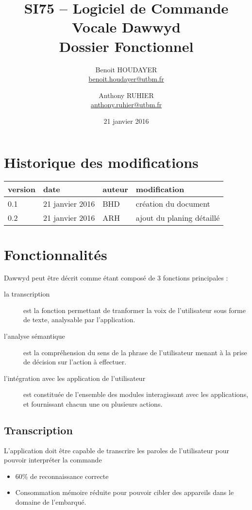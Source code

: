 \documentclass[12pt]{article}
\title{\textbf{SI75 -- Logiciel de Commande Vocale Dawwyd\\[0.5em]Dossier Fonctionnel}}
\author{Benoit HOUDAYER \\ \href{mailto:benoit.houdayer@utbm.fr}{benoit.houdayer@utbm.fr}
\and Anthony RUHIER \\ \href{mailto:anthony.ruhier@utbm.fr}{anthony.ruhier@utbm.fr}}
\date{21 janvier 2016}
\begin{document}
    \maketitle
    \thispagestyle{empty}
    \tableofcontents
    \listoffigures

    \section*{Historique des modifications}

    \begin{table}
    \centering

    \begin{tabular}{|l|l|l|l|}
        \hline
        version & date & auteur & modification \\
        \hline
        0.1 & 21 janvier 2016 & BHD & création du document \\
        0.2 & 21 janvier 2016 & ARH & ajout du planing détaillé \\
        \hline
    \end{tabular}
    \end{table}

    \afterpage{\cfoot{\thepage}}
    \newpage

    \section{Fonctionnalités}
    Dawwyd peut être décrit comme étant composé de 3 fonctions principales :
    \begin{description}
        \item[la transcription] est la fonction permettant de tranformer la voix
            de l'utilisateur sous forme de texte, analysable par l'application.
        \item[l'analyse sémantique] est la compréhension du sens de la phrase
            de l'utilisateur menant à la prise de décision sur
            l'action à effectuer.
        \item[l'intégration avec les application de l'utilisateur] est constituée
            de l'ensemble des modules interagissant avec les applications,
            et fournissant chacun une ou plusieurs actions.
    \end{description}

    \subsection{Transcription}
    L'application doit être capable de transcrire
    les paroles de l'utilisateur pour pouvoir interpréter la
    commande
    \begin{itemize}
        \item 60\% de reconnaissance correcte
        \item Consommation mémoire réduite pour pouvoir cibler des appareils
            dans le domaine de l'embarqué.
    \end{itemize}
\end{document}
